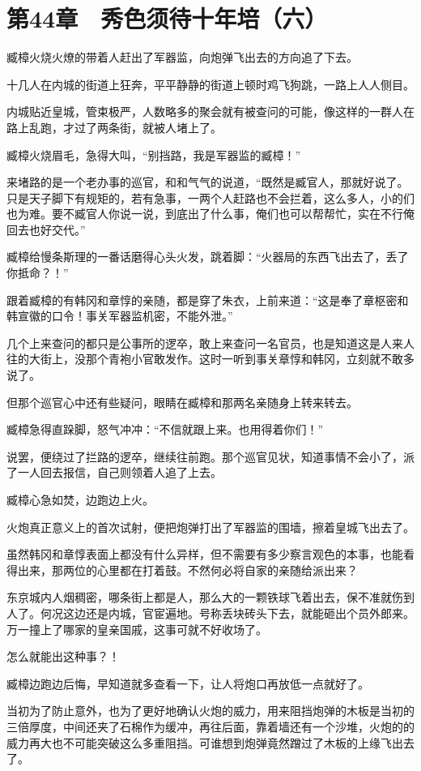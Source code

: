 \section{第44章　秀色须待十年培（六）}

臧樟火烧火燎的带着人赶出了军器监，向炮弹飞出去的方向追了下去。

十几人在内城的街道上狂奔，平平静静的街道上顿时鸡飞狗跳，一路上人人侧目。

内城贴近皇城，管束极严，人数略多的聚会就有被查问的可能，像这样的一群人在路上乱跑，才过了两条街，就被人堵上了。

臧樟火烧眉毛，急得大叫，“别挡路，我是军器监的臧樟！”

来堵路的是一个老办事的巡官，和和气气的说道，“既然是臧官人，那就好说了。只是天子脚下有规矩的，若有急事，一两个人赶路也不会拦着，这么多人，小的们也为难。要不臧官人你说一说，到底出了什么事，俺们也可以帮帮忙，实在不行俺回去也好交代。”

臧樟给慢条斯理的一番话磨得心头火发，跳着脚：“火器局的东西飞出去了，丢了你抵命？！”

跟着臧樟的有韩冈和章惇的亲随，都是穿了朱衣，上前来道：“这是奉了章枢密和韩宣徽的口令！事关军器监机密，不能外泄。”

几个上来查问的都只是公事所的逻卒，敢上来查问一名官员，也是知道这是人来人往的大街上，没那个青袍小官敢发作。这时一听到事关章惇和韩冈，立刻就不敢多说了。

但那个巡官心中还有些疑问，眼睛在臧樟和那两名亲随身上转来转去。

臧樟急得直跺脚，怒气冲冲：“不信就跟上来。也用得着你们！”

说罢，便绕过了拦路的逻卒，继续往前跑。那个巡官见状，知道事情不会小了，派了一人回去报信，自己则领着人追了上去。

臧樟心急如焚，边跑边上火。

火炮真正意义上的首次试射，便把炮弹打出了军器监的围墙，擦着皇城飞出去了。

虽然韩冈和章惇表面上都没有什么异样，但不需要有多少察言观色的本事，也能看得出来，那两位的心里都在打着鼓。不然何必将自家的亲随给派出来？

东京城内人烟稠密，哪条街上都是人，那么大的一颗铁球飞着出去，保不准就伤到人了。何况这边还是内城，官宦遍地。号称丢块砖头下去，就能砸出个员外郎来。万一撞上了哪家的皇亲国戚，这事可就不好收场了。

怎么就能出这种事？！

臧樟边跑边后悔，早知道就多查看一下，让人将炮口再放低一点就好了。

当初为了防止意外，也为了更好地确认火炮的威力，用来阻挡炮弹的木板是当初的三倍厚度，中间还夹了石棉作为缓冲，再往后面，靠着墙还有一个沙堆，火炮的的威力再大也不可能突破这么多重阻挡。可谁想到炮弹竟然蹭过了木板的上缘飞出去了。

